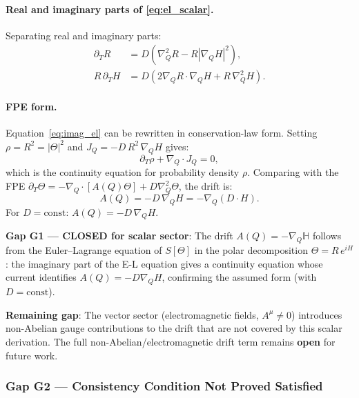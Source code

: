 \documentclass[12pt]{article}
\theoremstyle{definition}
\theoremstyle{remark}
\begin{document}
\paragraph{Real and imaginary parts of \eqref{eq:el_scalar}.}
Separating real and imaginary parts:
\begin{align}
  \partial_T R &= D\!\left(\nabla_Q^2 R - R|\nabla_Q H|^2\right), \label{eq:real_el}\\
  R\,\partial_T H &= D\!\left(2\nabla_Q R \cdot \nabla_Q H + R\,\nabla_Q^2 H\right).
  \label{eq:imag_el}
\end{align}

\paragraph{FPE form.}
Equation~\eqref{eq:imag_el} can be rewritten in conservation-law form.
Setting $\rho = R^2 = |\Theta|^2$ and $J_Q = -D\,R^2\,\nabla_Q H$ gives:
\begin{equation}
  \partial_T \rho + \nabla_Q \cdot J_Q = 0,
\end{equation}
which is the continuity equation for probability density $\rho$.
Comparing with the FPE $\partial_T\Theta = -\nabla_Q\cdot[A(Q)\Theta] + D\nabla_Q^2\Theta$, the drift is:
\begin{equation}
  \boxed{A(Q) = -D\,\nabla_Q H = -\nabla_Q(D\cdot H).}
  \label{eq:drift_derived}
\end{equation}
For $D = \mathrm{const}$: $A(Q) = -D\,\nabla_Q H$.

\begin{resultbox}
\textbf{Gap G1 — CLOSED for scalar sector}:
The drift $A(Q) = -\nabla_Q \mathbb{H}$ follows from the Euler--Lagrange equation
of $S[\Theta]$ in the polar decomposition $\Theta = R\,e^{iH}$:
the imaginary part of the E-L equation gives a continuity equation
whose current identifies $A(Q) = -D\nabla_Q H$, confirming the assumed form
(with $D = \mathrm{const}$).

\medskip
\textbf{Remaining gap}: The vector sector (electromagnetic fields, $A^\mu \neq 0$)
introduces non-Abelian gauge contributions to the drift that are not covered by
this scalar derivation.  The full non-Abelian/electromagnetic drift term remains
\textbf{open} for future work.
\end{resultbox}

\subsubsection{Gap G2 — Consistency Condition Not Proved Satisfied}
\end{document}
